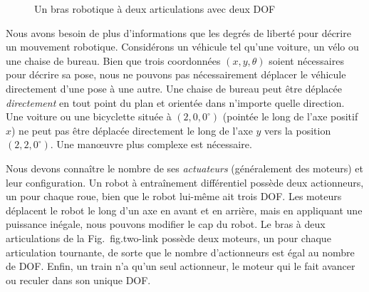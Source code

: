 {\begin{figure}
\begin{center}
\end{center}
\caption{Un bras robotique à deux articulations avec deux DOF}\label{fig.two-link}
\end{figure}

Nous avons besoin de plus d'informations que les degrés de liberté pour décrire un mouvement robotique. Considérons un véhicule tel qu'une voiture, un vélo ou une chaise de bureau. Bien que trois coordonnées $(x,y,\theta)$ soient nécessaires pour décrire sa pose, nous ne pouvons pas nécessairement déplacer le véhicule directement d'une pose à une autre. Une chaise de bureau peut être déplacée \emph{directement} en tout point du plan et orientée dans n'importe quelle direction. Une voiture ou une bicyclette située à $(2,0,0^\circ)$ (pointée le long de l'axe positif $x$) ne peut pas être déplacée directement le long de l'axe $y$ vers la position $(2,2,0^\circ)$. Une manœuvre plus complexe est nécessaire.

Nous devons connaître le nombre de ses \emph{actuateurs} (généralement des moteurs) et leur configuration. Un robot à entraînement différentiel possède deux actionneurs, un pour chaque roue, bien que le robot lui-même ait trois DOF. Les moteurs déplacent le robot le long d'un axe en avant et en arrière, mais en appliquant une puissance inégale, nous pouvons modifier le cap du robot. Le bras à deux articulations de la Fig.~{fig.two-link} possède deux moteurs, un pour chaque articulation tournante, de sorte que le nombre d'actionneurs est égal au nombre de DOF. Enfin, un train n'a qu'un seul actionneur, le moteur qui le fait avancer ou reculer dans son unique DOF.

}
